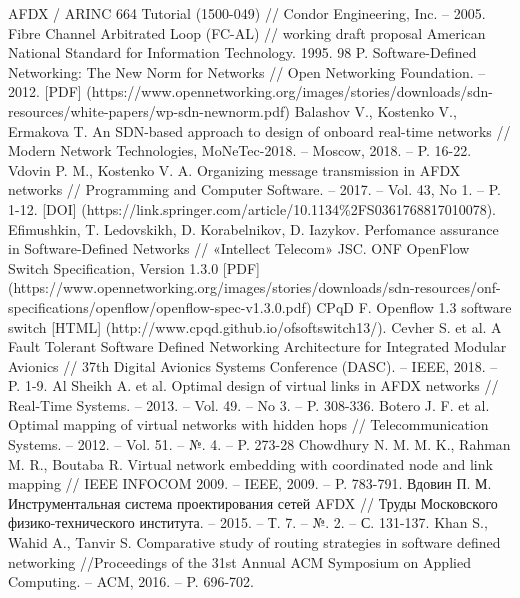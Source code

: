 \documentclass[12pt, a4paper]{article}
\begin{document}
\renewcommand{\bibname}{Список литературы}
\addcontentsline{toc}{section}{\bibname}

\begin{thebibliography}{}
	AFDX / ARINC 664 Tutorial (1500-049) // Condor Engineering, Inc. -- 2005.
	Fibre Channel Arbitrated Loop (FC-AL) // working draft proposal American National Standard for Information Technology. 1995. 98 P.
	Software-Defined Networking: The New Norm for Networks // Open Networking Foundation. -- 2012. [PDF] (https://www.opennetworking.org/images/stories/downloads/sdn-resources/white-papers/wp-sdn-newnorm.pdf)
	Balashov V., Kostenko V., Ermakova T. An SDN-based approach to design of onboard real-time networks // Modern Network Technologies, MoNeTec-2018. -- Moscow, 2018. -- P. 16-22.
	Vdovin P. M., Kostenko V. A. Organizing message transmission in AFDX networks // Programming and Computer Software. -- 2017. -- Vol. 43, No 1. -- P. 1-12. [DOI] (https://link.springer.com/article/10.1134\%2FS0361768817010078).
	Efimushkin, T. Ledovskikh, D. Korabelnikov, D. Iazykov. Perfomance assurance in Software-Defined Networks // «Intellect Telecom» JSC.
	ONF OpenFlow Switch Specification, Version 1.3.0 [PDF] (https://www.opennetworking.org/images/stories/downloads/sdn-resources/onf-specifications/openflow/openflow-spec-v1.3.0.pdf)
	CPqD F. Openflow 1.3 software switch [HTML] (http://www.cpqd.github.io/ofsoftswitch13/).
	Cevher S. et al. A Fault Tolerant Software Defined Networking Architecture for Integrated Modular Avionics // 37th Digital Avionics Systems Conference (DASC). -- IEEE, 2018. -- P. 1-9.
	Al Sheikh A. et al. Optimal design of virtual links in AFDX networks // Real-Time Systems. -- 2013. -- Vol. 49. -- No 3. -- P. 308-336.
	Botero J. F. et al. Optimal mapping of virtual networks with hidden hops // Telecommunication Systems. -- 2012. -- Vol. 51. -- №. 4. -- P. 273-28
	Chowdhury N. M. M. K., Rahman M. R., Boutaba R. Virtual network embedding with coordinated node and link mapping // IEEE INFOCOM 2009. -- IEEE, 2009. -- P. 783-791.
	Вдовин П. М. Инструментальная система проектирования сетей AFDX // Труды Московского физико-технического института. -- 2015. -- Т. 7. -- №. 2. -- С. 131-137.
	Khan S., Wahid A., Tanvir S. Comparative study of routing strategies in software defined networking //Proceedings of the 31st Annual ACM Symposium on Applied Computing. -- ACM, 2016. -- P. 696-702.

\end{thebibliography}
\end{document}
